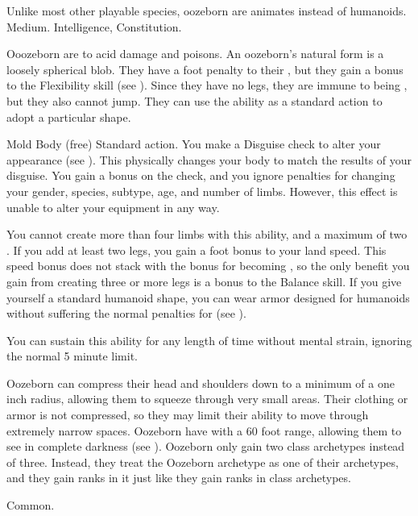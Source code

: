     Unlike most other playable species, oozeborn are animates instead of humanoids.
     Medium.
      Intelligence,  Constitution.
    \begin{itemize}
         Ooozeborn are  to acid damage and poisons.
         An oozeborn's natural form is a loosely spherical blob.
            They have a  foot penalty to their , but they gain a  bonus to the Flexibility skill (see ).
            Since they have no legs, they are immune to being \prone, but they also cannot jump.
            They can use the  ability as a standard action to adopt a particular shape.
            \begin{sustainability}{Mold Body}{ (free)}
                \abilityusagetime Standard action.
                \rankline
                You make a Disguise check to alter your appearance (see ).
                This physically changes your body to match the results of your disguise.
                You gain a  bonus on the check, and you ignore penalties for changing your gender, species, subtype, age, and number of limbs.
                However, this effect is unable to alter your equipment in any way.

                You cannot create more than four limbs with this ability, and a maximum of two .
                If you add at least two legs, you gain a  foot bonus to your land speed.
                This speed bonus does not stack with the bonus for becoming , so the only benefit you gain from creating three or more legs is a  bonus to the Balance skill.
                If you give yourself a standard humanoid shape, you can wear armor designed for humanoids without suffering the normal penalties for  (see ).

                You can sustain this ability for any length of time without mental strain, ignoring the normal 5 minute limit.
            \end{sustainability}
         Oozeborn can compress their head and shoulders down to a minimum of a one inch radius, allowing them to squeeze through very small areas.
            Their clothing or armor is not compressed, so they may limit their ability to move through extremely narrow spaces.
         Oozeborn have  with a 60 foot range, allowing them to see in complete darkness (see ).
         Oozeborn only gain two class archetypes instead of three.
            Instead, they treat the Oozeborn archetype as one of their archetypes, and they gain ranks in it just like they gain ranks in class archetypes.
    \end{itemize}
     Common.
    
